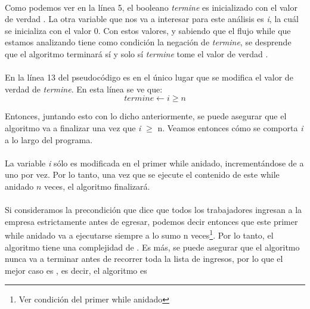 \paragraph{}
Como podemos ver en la línea 5, el booleano \textit{termine} es inicializado con el valor de verdad \false. La otra variable que nos va a interesar para este análisis es \textit{i}, la cuál se inicializa con el valor 0. Con estos valores, y sabiendo que el flujo while que estamos analizando tiene como condición la negación de \textit{termine}, se desprende que el algoritmo terminará sí y solo sí \textit{termine} tome el valor de verdad \true .

\paragraph{}
En la línea 13 del pseudocódigo es en el único lugar que se modifica el valor de verdad de \textit{termine}. En esta línea se ve que:
\begin{equation}
termine \leftarrow i \geq n
\end{equation}

Entonces, juntando esto con lo dicho anteriormente, se puede asegurar que el algoritmo va a finalizar una vez que \textit{i} \ensuremath{\geq} n. Veamos entonces cómo se comporta \textit{i} a lo largo del programa.

\paragraph{}
La variable \textit{i} sólo es modificada en el primer while anidado, incrementándose de a uno por vez. Por lo tanto, una vez que se ejecute el contenido de este while anidado $n$ veces, el algoritmo finalizará.

\paragraph{}
Si consideramos la precondición que dice que todos los trabajadores ingresan a la empresa estrictamente antes de egresar, podemos decir entonces que este primer while anidado va a ejecutarse siempre a lo sumo n veces\footnote{Ver condición del primer while anidado}. Por lo tanto, el algoritmo tiene una complejidad de . Es más, se puede asegurar que el algoritmo nunca va a terminar antes de recorrer toda la lista de ingresos, por lo que el mejor caso es , es decir, el algoritmo es 



